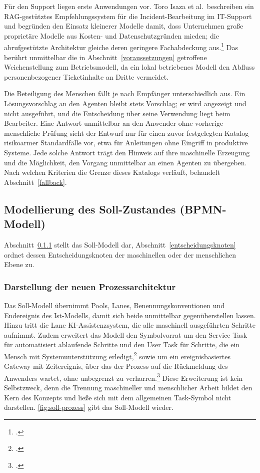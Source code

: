 F\"ur den Support liegen erste Anwendungen vor. Toro Isaza et al.~beschreiben ein RAG-gest\"utztes Empfehlungssystem f\"ur die Incident-Bearbeitung im IT-Support und begr\"unden den Einsatz kleinerer Modelle damit, dass Unternehmen gro{\ss}e propriet\"are Modelle aus Kosten- und Datenschutzgr\"unden mieden; die abrufgest\"utzte Architektur gleiche deren geringere Fachabdeckung aus.\footcite[Vgl.][S.~1]{ToroIsaza2024} Das ber\"uhrt unmittelbar die in Abschnitt~\ref{voraussetzungen} getroffene Weichenstellung zum Betriebsmodell, da ein lokal betriebenes Modell den Abfluss personenbezogener Ticketinhalte an Dritte vermeidet.

Die Beteiligung des Menschen f\"allt je nach Empf\"anger unterschiedlich aus. Ein L\"osungsvorschlag an den Agenten bleibt stets Vorschlag; er wird angezeigt und nicht ausgef\"uhrt, und die Entscheidung \"uber seine Verwendung liegt beim Bearbeiter. Eine Antwort unmittelbar an den Anwender ohne vorherige menschliche Pr\"ufung sieht der Entwurf nur f\"ur einen zuvor festgelegten Katalog risikoarmer Standardf\"alle vor, etwa f\"ur Anleitungen ohne Eingriff in produktive Systeme. Jede solche Antwort tr\"agt den Hinweis auf ihre maschinelle Erzeugung und die M\"oglichkeit, den Vorgang unmittelbar an einen Agenten zu \"ubergeben. Nach welchen Kriterien die Grenze dieses Katalogs verl\"auft, behandelt Abschnitt~\ref{fallback}.

\subsection{Modellierung des Soll-Zustandes (BPMN-Modell)}
\label{sollModell}

Abschnitt~\ref{prozessarchitektur} stellt das Soll-Modell dar, Abschnitt~\ref{entscheidungsknoten} ordnet dessen Entscheidungsknoten der maschinellen oder der menschlichen Ebene zu.

\subsubsection{Darstellung der neuen Prozessarchitektur}
\label{prozessarchitektur}

Das Soll-Modell \"ubernimmt Pools, Lanes, Benennungskonventionen und Endereignis des Ist-Modells, damit sich beide unmittelbar gegen\"uberstellen lassen. Hinzu tritt die Lane \glqq KI-Assistenzsystem\grqq{}, die alle maschinell ausgef\"uhrten Schritte aufnimmt. Zudem erweitert das Modell den Symbolvorrat um den Service Task f\"ur automatisiert ablaufende Schritte und den User Task f\"ur Schritte, die ein Mensch mit Systemunterst\"utzung erledigt,\footcite[Vgl.][S.~156 und 160]{OMG2013} sowie um ein ereignisbasiertes Gateway mit Zeitereignis, \"uber das der Prozess auf die R\"uckmeldung des Anwenders wartet, ohne unbegrenzt zu verharren.\footcite[Vgl.][S.~273 und 296]{OMG2013} Diese Erweiterung ist kein Selbstzweck, denn die Trennung maschineller und menschlicher Arbeit bildet den Kern des Konzepts und lie{\ss}e sich mit dem allgemeinen Task-Symbol nicht darstellen. \autoref{fig:soll-prozess} gibt das Soll-Modell wieder.

